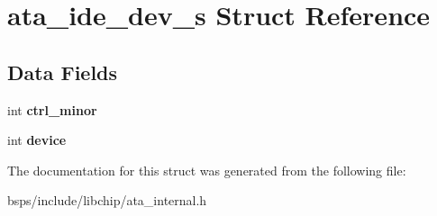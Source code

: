 \hypertarget{structata__ide__dev__s}{}\section{ata\+\_\+ide\+\_\+dev\+\_\+s Struct Reference}
\label{structata__ide__dev__s}
\subsection*{Data Fields}
\begin{DoxyCompactItemize}
\item 
\mbox{\label{structata__ide__dev__s_a0f1025dd780649abe2388b1687ea7967}} 
int {\bfseries ctrl\+\_\+minor}
\item 
\mbox{\label{structata__ide__dev__s_a811f62679a42a8b76e3fa6ef846f94ed}} 
int {\bfseries device}
\end{DoxyCompactItemize}


The documentation for this struct was generated from the following file\+:\begin{DoxyCompactItemize}
\item 
bsps/include/libchip/ata\+\_\+internal.\+h\end{DoxyCompactItemize}
